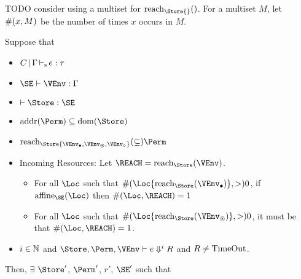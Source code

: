 TODO consider using a multiset for $\Reach\Store{}$. For a multiset
$M$, let $\#(x,M)$ be the number of times $x$ occurs in $M$.
\clearpage{}
\begin{theorem}
  Suppose that
  \begin{itemize}
  \item $C \operatorname{|} \Gamma \operatorname{\vdash_s} e : \tau$
  \item $\SE \vdash \VEnv : \E$
  \item $\vdash \Store : \SE$
  \item $\Addresses\Perm \subseteq \Dom\Store$
  \item $\Reach\Store{\Active\VEnv, \MutableBorrows\VEnv, \ImmutableBorrows\VEnv} \subseteq \Perm$
  \item Incoming Resources: Let $\REACH = \Reach\Store\VEnv$.
    \begin{itemize}
    \item 
      For all $\Loc$ such that $\MultiNumber\Loc{\Reach{\Store}{\Active\VEnv}} >0$,
      if $\Affine{\SE}\Loc$ then $\MultiNumber\Loc\REACH= 1$
    \item For all $\Loc$ such that $
      \MultiNumber\Loc{\Reach{\Store}{\MutableBorrows\VEnv}} >0$, it
      must be that $\MultiNumber\Loc\REACH=1$.
    \end{itemize}
  \item  $i\in\mathbb{N}$ and $\Store, \Perm, \VEnv \vdash {e}
    \Downarrow^i R$ and $R\ne \operatorname{TimeOut}$.
  \end{itemize}
  Then,
  $\exists$ $\Store'$, $\Perm'$, $r'$, $\SE'$ such that
\end{theorem}
